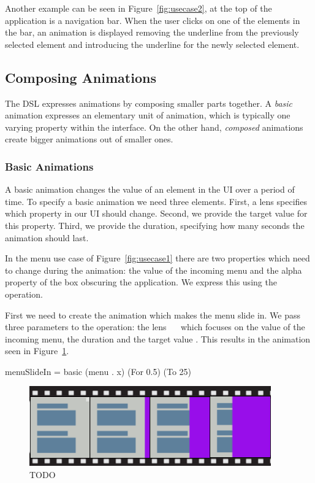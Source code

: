 Another example can be seen in Figure~\ref{fig:usecase2}, at the top of the application is a navigation bar. When the user clicks on one of the elements in the bar, an animation is displayed removing the underline from the previously selected element and introducing the underline for the newly selected element.

\subsection{Composing Animations}

The DSL expresses animations by composing smaller parts together. A \emph{basic} animation expresses an elementary unit of animation, which is typically one varying property within the interface. On the other hand, \emph{composed} animations create bigger animations out of smaller ones.

\subsubsection{Basic Animations}

A basic animation changes the value of an element in the UI over a period of time. To specify a basic animation we need three elements. First, a lens specifies which property in our UI should change. Second, we provide the target value for this property. Third, we provide the duration, specifying how many seconds the animation should last.

In the menu use case of Figure~\ref{fig:usecase1} there are two properties which need to change during the animation: the  value of the incoming menu and the alpha property of the box obscuring the application. We express this using the  operation.

First we need to create the animation which makes the menu slide in. We pass three parameters to the  operation: the lens ~~ which focuses on the  value of the incoming menu, the duration  and the target value . This results in the animation seen in Figure~\ref{fig:usecase1basic1}.

\begin{spec}
menuSlideIn = basic (menu . x) (For 0.5) (To 25)
\end{spec}

\begin{figure}[H]
\centering
\includegraphics[scale=0.4]{pictures/usecase1basic1.png}
\caption{TODO}
\label{fig:usecase1basic1}
\end{figure}

